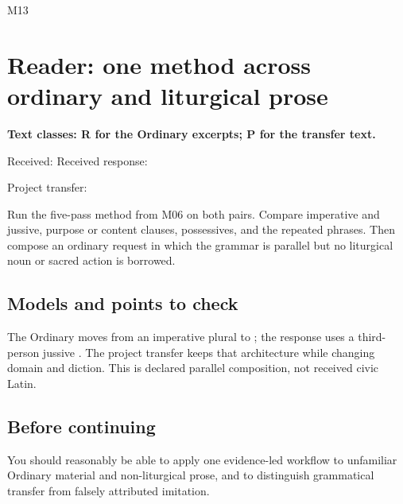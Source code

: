 \begin{courseunit}{M13}
\chapter{Reader: one method across ordinary and liturgical prose}

\textbf{Text classes: R for the Ordinary excerpts; P for the transfer text.}

Received:   Received response: 

Project transfer: 

Run the five-pass method from M06 on both pairs.  Compare imperative and jussive,
purpose or content clauses, possessives, and the repeated  phrases.
Then compose an ordinary request in which the grammar is parallel but no
liturgical noun or sacred action is borrowed.

\ifsolutions
\section{Models and points to check}
The Ordinary moves from an imperative plural to ; the
response uses a third-person jussive .  The project transfer
keeps that architecture while changing domain and diction.  This is declared
parallel composition, not received civic Latin.
\else
\section{Before continuing}
You should reasonably be able to apply one evidence-led workflow to unfamiliar
Ordinary material and non-liturgical prose, and to distinguish grammatical
transfer from falsely attributed imitation.
\fi
\end{courseunit}


